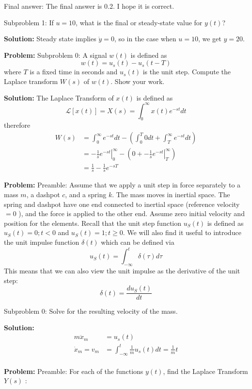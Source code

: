 \documentclass[10pt]{article}
\begin{document}
Final answer: The final answer is 0.2. I hope it is correct.

Subproblem 1: If \(u=10\), what is the final or steady-state value for \(y(t)\)? 


\textbf{Solution:}
Steady state implies $\dot{y} = 0$, so in the case when $u=10$, we get $y=\boxed{20}$.


\textbf{Problem:}
Subproblem 0: A signal \(w(t)\) is defined as
\[
w(t)=u_{s}(t)-u_{s}(t-T)
\]
where \(T\) is a fixed time in seconds and \(u_{s}(t)\) is the unit step. Compute the Laplace transform \(W(s)\) of \(w(t)\). Show your work.


\textbf{Solution:}
The Laplace Transform of \(x(t)\) is defined as
\[
\mathcal{L}[x(t)]=X(s)=\int_{0}^{\infty} x(t) e^{-s t} d t
\]
therefore
\[
\begin{aligned}
W(s) &=\int_{0}^{\infty} e^{-s t} d t-\left(\int_{0}^{T} 0 d t+\int_{T}^{\infty} e^{-s t} d t\right) \\
&=-\left.\frac{1}{s} e^{-s t}\right|_{0} ^{\infty}-\left(0+-\left.\frac{1}{s} e^{-s t}\right|_{T} ^{\infty}\right) \\
&=\boxed{\frac{1}{s}-\frac{1}{s} e^{-s T}}
\end{aligned}
\]


\textbf{Problem:}
Preamble: Assume that we apply a unit step in force separately to a mass \(m\), a dashpot \(c\), and a spring \(k\). The mass moves in inertial space. The spring and dashpot have one end connected to inertial space (reference velocity \(=0\) ), and the force is applied to the other end.  Assume zero initial velocity and position for the elements.
Recall that the unit step function \(u_{S}(t)\) is defined as \(u_{S}(t)=0 ; t<0\) and \(u_{S}(t)=1 ; t \geq 0\). We will also find it useful to introduce the unit impulse function \(\delta(t)\) which can be defined via
\[
u_{S}(t)=\int_{-\infty}^{t} \delta(\tau) d \tau
\]
This means that we can also view the unit impulse as the derivative of the unit step:
\[
\delta(t)=\frac{d u_{S}(t)}{d t}
\]

Subproblem 0: Solve for the resulting velocity of the mass.


\textbf{Solution:}
\[
\begin{aligned}
m \ddot{x}_{m} &=u_{s}(t) \\
\dot{x}_{m}=v_{m} &=\int_{-\infty}^{t} \frac{1}{m} u_{s}(t) d t=\boxed{\frac{1}{m} t} \\
\end{aligned}
\]


\textbf{Problem:}
Preamble: For each of the functions $y(t)$, find the Laplace Transform $Y(s)$ :
\end{document}
